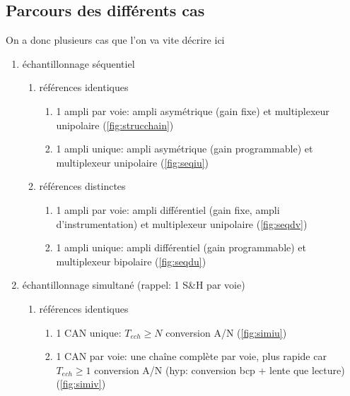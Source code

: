 \subsection{Parcours des différents cas}
On a donc plusieurs cas que l'on va vite décrire ici
\begin{enumerate}
	\item échantillonnage séquentiel
	\begin{enumerate}
		\item références identiques
		\begin{enumerate}
			\item 1 ampli par voie: ampli asymétrique (gain fixe) et multiplexeur unipolaire (\autoref{fig:strucchain})
			\item 1 ampli unique: ampli asymétrique (gain programmable) et multiplexeur unipolaire (\autoref{fig:seqiu})
		\end{enumerate}
		\item références distinctes
		\begin{enumerate}
			\item 1 ampli par voie: ampli différentiel (gain fixe, ampli d'instrumentation) et multiplexeur unipolaire (\autoref{fig:seqdv})
			\item 1 ampli unique: ampli différentiel (gain programmable) et multiplexeur bipolaire (\autoref{fig:seqdu})
		\end{enumerate}
	\end{enumerate}
	\item échantillonnage simultané (rappel: 1 S\&H par voie)
	\begin{enumerate}
		\item références identiques
		\begin{enumerate}
			\item 1 CAN unique: \(T_{ech}\geq N \) conversion A/N (\autoref{fig:simiu})
			\item 1 CAN par voie: une chaîne complète par voie, plus rapide car \(T_{ech}\geq 1\) conversion A/N (hyp: conversion bcp + lente que lecture) (\autoref{fig:simiv})
		\end{enumerate}
	\end{enumerate}
\end{enumerate}
